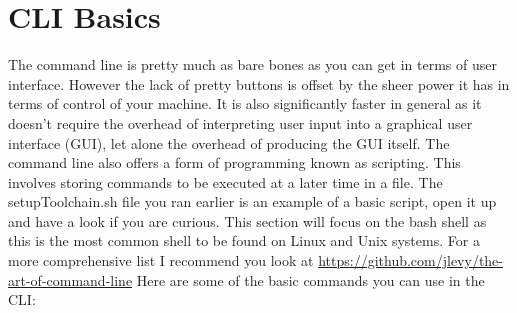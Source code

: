 \documentclass[a4paper,11pt]{report}
\begin{document}
		\section{CLI Basics}
			The command line is pretty much as bare bones as you can get in terms of user interface.
			However the lack of pretty buttons is offset by the sheer power it has in terms of control of your machine.
			It is also significantly faster in general as it doesn't require the overhead of interpreting user input into a graphical user interface (GUI), let alone the overhead of producing the GUI itself.
			The command line also offers a form of programming known as scripting. This involves storing commands to be executed at a later time in a file.
			The setupToolchain.sh file you ran earlier is an example of a basic script, open it up and have a look if you are curious.
			This section will focus on the bash shell as this is the most common shell to be found on Linux and Unix systems. For a more comprehensive list I recommend you look at \url{https://github.com/jlevy/the-art-of-command-line}
			Here are some of the basic commands you can use in the CLI:
\end{document}

